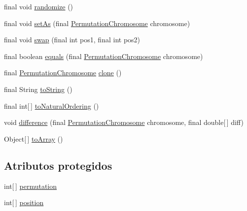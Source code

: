 \begin{DoxyCompactItemize}
\item 
final void \hyperlink{classjenes_1_1chromosome_1_1_permutation_chromosome_af1bec1fbdb637818dd33fbbe3c43d07f}{randomize} ()
\item 
final void \hyperlink{classjenes_1_1chromosome_1_1_permutation_chromosome_ad1e5735c594b7c43f7cca5996da5741e}{set\-As} (final \hyperlink{classjenes_1_1chromosome_1_1_permutation_chromosome}{Permutation\-Chromosome} chromosome)
\item 
final void \hyperlink{classjenes_1_1chromosome_1_1_permutation_chromosome_a9dbfb8b76280184a204e89f737740f8f}{swap} (final int pos1, final int pos2)
\item 
final boolean \hyperlink{classjenes_1_1chromosome_1_1_permutation_chromosome_a2cac25997ad82e5f3793bd65c8de1b37}{equals} (final \hyperlink{classjenes_1_1chromosome_1_1_permutation_chromosome}{Permutation\-Chromosome} chromosome)
\item 
final \hyperlink{classjenes_1_1chromosome_1_1_permutation_chromosome}{Permutation\-Chromosome} \hyperlink{classjenes_1_1chromosome_1_1_permutation_chromosome_a026be97457b0600bf9c4467e34073e93}{clone} ()
\item 
final String \hyperlink{classjenes_1_1chromosome_1_1_permutation_chromosome_a63f526a0f6f85fda55f2bcacbacd2072}{to\-String} ()
\item 
final int\mbox{[}$\,$\mbox{]} \hyperlink{classjenes_1_1chromosome_1_1_permutation_chromosome_a0aeb1df52bf751baa4706e5d94dae60d}{to\-Natural\-Ordering} ()
\item 
void \hyperlink{classjenes_1_1chromosome_1_1_permutation_chromosome_a20c34256408cab0b265d69decd40dabd}{difference} (final \hyperlink{classjenes_1_1chromosome_1_1_permutation_chromosome}{Permutation\-Chromosome} chromosome, final double\mbox{[}$\,$\mbox{]} diff)
\item 
Object\mbox{[}$\,$\mbox{]} \hyperlink{classjenes_1_1chromosome_1_1_permutation_chromosome_a8b14d4ba9c616335a901103f1879569a}{to\-Array} ()
\end{DoxyCompactItemize}
\subsection*{Atributos protegidos}
\begin{DoxyCompactItemize}
\item 
int\mbox{[}$\,$\mbox{]} \hyperlink{classjenes_1_1chromosome_1_1_permutation_chromosome_a8b5701fbbb3cdfef29d346e0375260fc}{permutation}
\item 
int\mbox{[}$\,$\mbox{]} \hyperlink{classjenes_1_1chromosome_1_1_permutation_chromosome_aeb2d393eb8a9cc106205e13fb88446cc}{position}
\end{DoxyCompactItemize}


